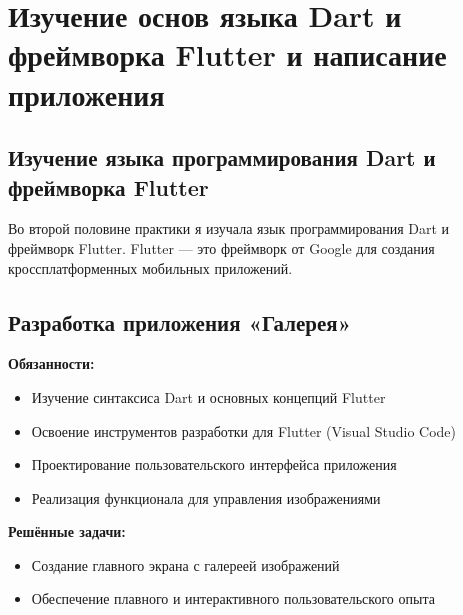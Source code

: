 \section{Изучение основ языка Dart и фреймворка Flutter и написание приложения}
\subsection{Изучение языка программирования Dart и фреймворка Flutter}
Во второй половине практики я изучала язык программирования Dart и фреймворк Flutter. Flutter — это фреймворк от Google для создания кроссплатформенных мобильных приложений.

\subsection{Разработка приложения «Галерея»}
\textbf{Обязанности:}
\begin{itemize}
    \item Изучение синтаксиса Dart и основных концепций Flutter
    \item Освоение инструментов разработки для Flutter (Visual Studio Code)
    \item Проектирование пользовательского интерфейса приложения
    \item Реализация функционала для управления изображениями
\end{itemize}

\textbf{Решённые задачи:}
\begin{itemize}
    \item Создание главного экрана с галереей изображений
    \item Обеспечение плавного и интерактивного пользовательского опыта
\end{itemize}